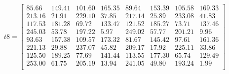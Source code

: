 \documentclass{article}
\begin{document}
    \[
    t8=
    \begin{bmatrix} 
    85.66 &	149.41 &	101.60 &	165.35 &	89.64 &	153.39 &	105.58 &	169.33 \\
213.16 &	21.91 &	229.10 &	37.85 &	217.14 &	25.89 &	233.08 &	41.83 \\
117.53 &	181.28 &	69.72 &	133.47 &	121.52 &	185.27 &	73.71 &	137.46 \\
245.03 &	53.78 &	197.22 &	5.97 &	249.02 &	57.77 &	201.21 &	9.96 \\
93.63 &	157.38 &	109.57 &	173.32 &	81.67 &	145.42 &	97.61 &	161.36 \\
221.13 &	29.88 &	237.07 &	45.82 &	209.17 &	17.92 &	225.11 &	33.86 \\
125.50 &	189.25 &	77.69 &	141.44 &	113.55 &	177.30 &	65.74 &	129.49 \\
253.00 &	61.75 &	205.19 &	13.94 &	241.05 &	49.80 &	193.24 &	1.99 \\
    \end{bmatrix}
    \]
\end{document}
